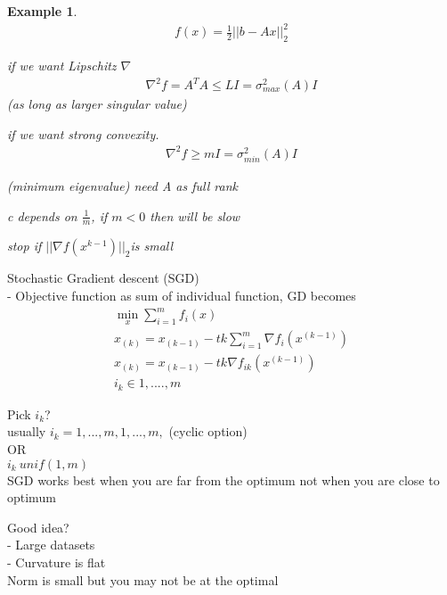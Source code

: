 \documentclass[10pt]{article}
\newtheorem{example}[ex]{Example}
\begin{document}
\begin{example}
\begin{equation}
\begin{aligned}
	f(x) = \frac{1}{2} ||b - Ax||_2^{2}
\end{aligned}
\end{equation}

if we want Lipschitz $\nabla$ \\
\begin{equation}
\begin{aligned}
	\nabla^{2}f = A^{T}A \leq LI = \sigma_{max}^{2} (A)I
\end{aligned}
\end{equation}
(as long as larger singular value)

if we want strong convexity.
\begin{equation}
\begin{aligned}
	\nabla^{2}f \geq mI = \sigma_{min}^{2} (A)I
\end{aligned}
\end{equation}

(minimum eigenvalue)
need A as full rank

c depends on $\frac{1}{m}$, if $m < 0$ then will be slow

stop if $||\nabla f(x^{k-1})||_2$is small
\end{example}


Stochastic Gradient descent (SGD) \\
- Objective function as sum of individual function, GD becomes \\
\begin{equation}
\begin{aligned}
	\min_x \sum_{i=1}^{m} f_i(x) \\
	x_{(k)} = x_{(k-1)} - tk \sum_{i=1}^{m} \nabla f_i(x^(k-1)) \\
	x_{(k)} = x_{(k-1)} - tk\nabla f_{ik}(x^(k-1)) \\
	i_k \in {1,....,m}
\end{aligned}
\end{equation}

Pick $i_k$? \\
usually $i_k = 1,...,m,1,...,m, $ (cyclic option) \\
OR \\
$i_k ~ unif({1,m})$ \\
SGD works best when you are far from the optimum not when you are close to optimum

Good idea? \\
- Large datasets \\
- Curvature is flat \\
Norm is small but you may not be at the optimal\\
\end{document}
